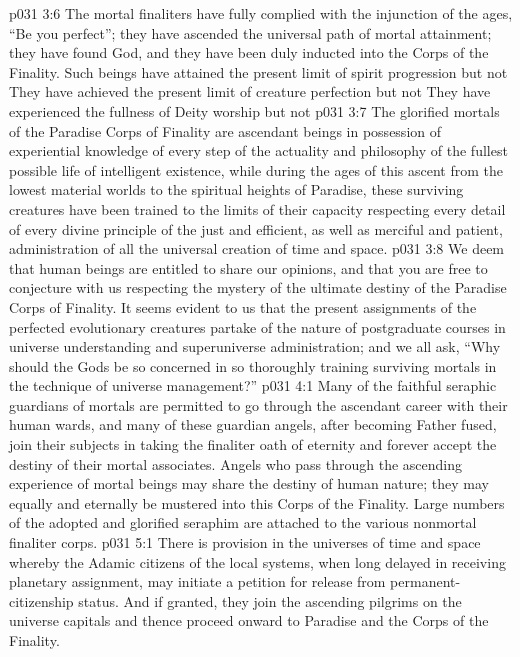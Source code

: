 \vs p031 3:6 \pc {}\bibnobreakspace The mortal finaliters have fully complied with the injunction of the ages, “Be you perfect”; they have ascended the universal path of mortal attainment; they have found God, and they have been duly inducted into the Corps of the Finality. Such beings have attained the present limit of spirit progression but not  They have achieved the present limit of creature perfection but not  They have experienced the fullness of Deity worship but not 
\vs p031 3:7 \pc {}\bibnobreakspace The glorified mortals of the Paradise Corps of Finality are ascendant beings in possession of experiential knowledge of every step of the actuality and philosophy of the fullest possible life of intelligent existence, while during the ages of this ascent from the lowest material worlds to the spiritual heights of Paradise, these surviving creatures have been trained to the limits of their capacity respecting every detail of every divine principle of the just and efficient, as well as merciful and patient, administration of all the universal creation of time and space.
\vs p031 3:8 \pc We deem that human beings are entitled to share our opinions, and that you are free to conjecture with us respecting the mystery of the ultimate destiny of the Paradise Corps of Finality. It seems evident to us that the present assignments of the perfected evolutionary creatures partake of the nature of postgraduate courses in universe understanding and superuniverse administration; and we all ask, “Why should the Gods be so concerned in so thoroughly training surviving mortals in the technique of universe management?”
\vs p031 4:1 Many of the faithful seraphic guardians of mortals are permitted to go through the ascendant career with their human wards, and many of these guardian angels, after becoming Father fused, join their subjects in taking the finaliter oath of eternity and forever accept the destiny of their mortal associates. Angels who pass through the ascending experience of mortal beings may share the destiny of human nature; they may equally and eternally be mustered into this Corps of the Finality. Large numbers of the adopted and glorified seraphim are attached to the various nonmortal finaliter corps.
\vs p031 5:1 There is provision in the universes of time and space whereby the Adamic citizens of the local systems, when long delayed in receiving planetary assignment, may initiate a petition for release from permanent\hyp{}citizenship status. And if granted, they join the ascending pilgrims on the universe capitals and thence proceed onward to Paradise and the Corps of the Finality.
